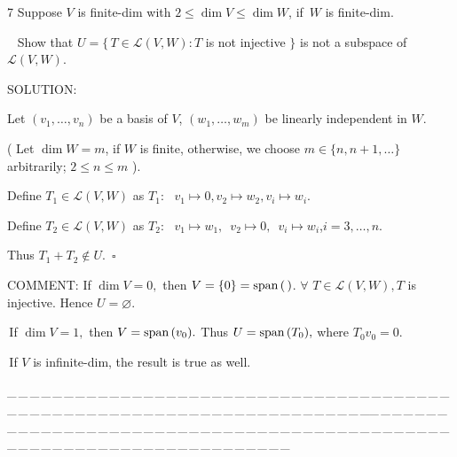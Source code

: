 \documentclass[a4paper, 11pt, UTF8]{article}
\def\Spn{\textup{span}\,}
\def\Lm{\mathcal{L}}
\begin{document}
\begin{large}
{\timesbf\Large 7} {\timessl\Large 
Suppose $V$ is finite-dim with $2\leq\dim V\leq\dim W$, if \,$W$ is finite-dim.}\par\,\,\,
{\timessl\Large Show that $U=\{\,T\in\Lm(V, W):T$ is not injective $\}$ is not a subspace of $\Lm(V, W)$.
}\par
{\timesbf S\footnotesize{OLUTION:}}\par\quad
Let $(v_1,\dots,v_n)$ be a basis of $V$, $(w_1,\dots,w_m)$ be linearly independent in $W$.\par\quad
( Let $\dim W=m$, if $W$ is finite, otherwise, we choose $m\in\{n,n+1,\dots\}$ arbitrarily; $2\leq n\leq m$ ).\par\quad
Define $T_1\in\Lm(V,W)$ as $T_1:\,\,\,\,v_1\mapsto 0,$\qquad$v_2\mapsto w_2,$\qquad$v_i\mapsto w_i$.\par\quad
Define $T_2\in\Lm(V,W)$ as $T_2:\,\,\,\,v_1\mapsto w_1,$ \quad\,$v_2\mapsto 0,$\,\,\,\qquad$v_i\mapsto w_i$,\qquad $i=3,\dots,n.$\par\quad
Thus $T_1+T_2\not\in U.\,\,\,\square$\par
{\timesbf C\small{OMMENT:}} If $\dim V=0,$ then $V=\{0\}=\Spn(\,)$. $\forall\,\,T\in\Lm(V,W), T$ is injective. Hence $U=\varnothing$.\par\qquad\qquad\quad\,If $\dim V=1,$ then $V=\Spn(v_0).$ Thus $U=\Spn(T_0),$ where $T_0 v_0=0.$\par\qquad\qquad\quad\,If $V$ is infinite-dim, the result is true as well.\par
{\tiny \_\,\_\,\_\,\_\,\_\,\_\,\_\,\_\,\_\,\_\,\_\,\_\,\_\,\_\,\_\,\_\,\_\,\_\,\_\,\_\,\_\,\_\,\_\,\_\,\_\,\_\,\_\,\_\,\_\,\_\,\_\,\_\,\_\,\_\,\_\,\_\,\_\,\_\,\_\,\_\,\_\,\_\,\_\,\_\,\_\,\_\,\_\,\_\,\_\,\_\,\_\,\_\,\_\,\_\,\_\,\_\,\_\,\_\,\_\,\_\,\_\,\_\,\_\,\_\,\_\,\_\,\_\,\_\,\_\,\_\,\_\_\,\_\,\_\,\_\,\_\,\_\,\_\,\_\,\_\,\_\,\_\,\_\,\_\,\_\,\_\,\_\,\_\,\_\,\_\,\_\,\_\,\_\,\_\,\_\,\_\,\_\,\_\,\_\,\_\,\_\,\_\,\_\,\_\,\_\,\_\,\_\,\_\,\_\,\_\,\_\,\_\,\_\,\_\,\_\,\_\,\_\,\_\,\_\,\_\,\_\,\_\,\_\,\_\,\_\,\_\,\_\,\_\,\_\,\_\,\_\,\_\,\_\,\_\,\_\,\_\,\_\,\_\,\_\,\_\,\_\,\_}{\tiny\,\par}


\end{large}
\end{document}
